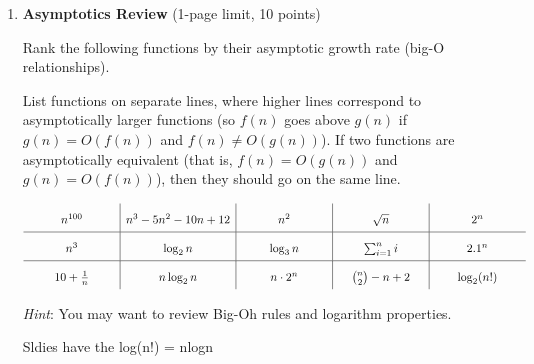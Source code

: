 \documentclass[11pt]{article}
\begin{document}
\begin{enumerate}
\begin{enumerate}
\end{enumerate}

\item {\bf Asymptotics Review} (1-page limit, 10 points)

Rank the following functions by their asymptotic growth rate (big-O relationships). 

List functions on separate lines, where higher lines correspond to asymptotically larger functions (so $f(n)$ goes above $g(n)$ if $g(n)=O(f(n))$ and $f(n)\neq O(g(n))$). If two functions are asymptotically equivalent (that is, $f(n)=O(g(n))$ and $g(n)=O(f(n))$), then they should go on the same line.


\[
\renewcommand{\arraystretch}{2}
\begin{array}{c|c|c|c|c}
 \makebox[1in]{\ensuremath{n^{100}}}& 
 n^3 - 5n^2 -10 n + 12 & 
  \makebox[1in]{\ensuremath{n^{2} }}& 
  \makebox[1in]{\ensuremath{\sqrt{n} }} & 
  \makebox[1in]{\ensuremath{2^n }}
\\ \hline 
n^3 & \log_2 n & \log_3 n  & \sum_{i=1}^n i & 2.1^n\\ \hline 
10 +\frac{1}{n} & n\log_2{n} & n\cdot 2^n & \binom{n}{2} - n + 2 &\log_2(n!)\\
\end{array}
\renewcommand{\arraystretch}{1}
\]


\emph{Hint}: You may want to review Big-Oh rules and logarithm properties.


\color{teal}
Sldies have the log(n!) = nlogn

\end{enumerate}
\end{document}
